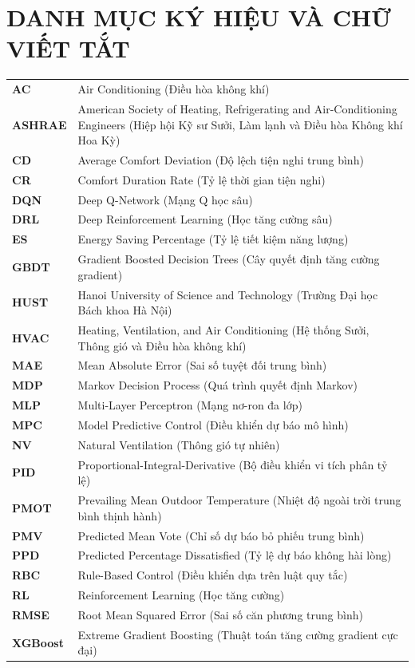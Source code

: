 \section*{DANH MỤC KÝ HIỆU VÀ CHỮ VIẾT TẮT}
 {}

\noindent
\begin{tabular}{p{2.5cm} p{12cm}}
\textbf{AC} & Air Conditioning (Điều hòa không khí) \\
\textbf{ASHRAE} & American Society of Heating, Refrigerating and Air-Conditioning Engineers (Hiệp hội Kỹ sư Sưởi, Làm lạnh và Điều hòa Không khí Hoa Kỳ) \\
\textbf{CD} & Average Comfort Deviation (Độ lệch tiện nghi trung bình) \\
\textbf{CR} & Comfort Duration Rate (Tỷ lệ thời gian tiện nghi) \\
\textbf{DQN} & Deep Q-Network (Mạng Q học sâu) \\
\textbf{DRL} & Deep Reinforcement Learning (Học tăng cường sâu) \\
\textbf{ES} & Energy Saving Percentage (Tỷ lệ tiết kiệm năng lượng) \\
\textbf{GBDT} & Gradient Boosted Decision Trees (Cây quyết định tăng cường gradient) \\
\textbf{HUST} & Hanoi University of Science and Technology (Trường Đại học Bách khoa Hà Nội) \\
\textbf{HVAC} & Heating, Ventilation, and Air Conditioning (Hệ thống Sưởi, Thông gió và Điều hòa không khí) \\
\textbf{MAE} & Mean Absolute Error (Sai số tuyệt đối trung bình) \\
\textbf{MDP} & Markov Decision Process (Quá trình quyết định Markov) \\
\textbf{MLP} & Multi-Layer Perceptron (Mạng nơ-ron đa lớp) \\
\textbf{MPC} & Model Predictive Control (Điều khiển dự báo mô hình) \\
\textbf{NV} & Natural Ventilation (Thông gió tự nhiên) \\
\textbf{PID} & Proportional-Integral-Derivative (Bộ điều khiển vi tích phân tỷ lệ) \\
\textbf{PMOT} & Prevailing Mean Outdoor Temperature (Nhiệt độ ngoài trời trung bình thịnh hành) \\
\textbf{PMV} & Predicted Mean Vote (Chỉ số dự báo bỏ phiếu trung bình) \\
\textbf{PPD} & Predicted Percentage Dissatisfied (Tỷ lệ dự báo không hài lòng) \\
\textbf{RBC} & Rule-Based Control (Điều khiển dựa trên luật quy tắc) \\
\textbf{RL} & Reinforcement Learning (Học tăng cường) \\
\textbf{RMSE} & Root Mean Squared Error (Sai số căn phương trung bình) \\
\textbf{XGBoost} & Extreme Gradient Boosting (Thuật toán tăng cường gradient cực đại) \\
\end{tabular}

\newpage